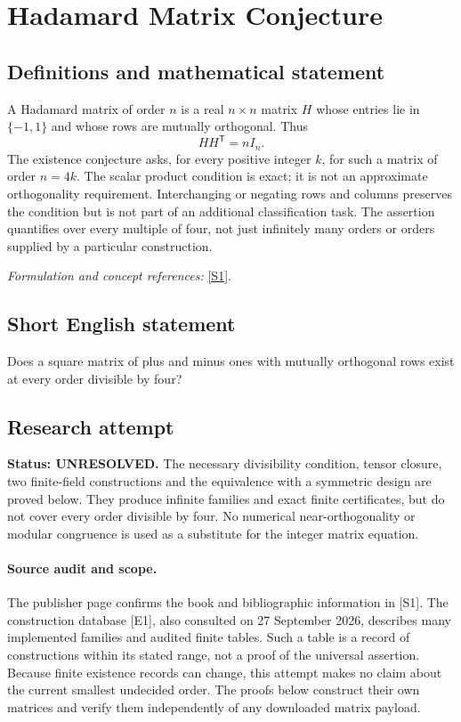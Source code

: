 \documentclass[11pt]{article}
\begin{document}
\section*{\texorpdfstring{Hadamard Matrix Conjecture}{Hadamard Matrix Conjecture}}\label{1454}
\subsection{Definitions and mathematical statement}
A Hadamard matrix of order $n$ is a real $n\times n$ matrix $H$ whose entries lie in $\{-1,1\}$ and whose rows are mutually orthogonal. Thus
\[
 HH^{\mathsf T}=nI_n.
\]
The existence conjecture asks, for every positive integer $k$, for such a matrix of order $n=4k$. The scalar product condition is exact; it is not an approximate orthogonality requirement. Interchanging or negating rows and columns preserves the condition but is not part of an additional classification task. The assertion quantifies over every multiple of four, not just infinitely many orders or orders supplied by a particular construction.
\par\smallskip\textit{Formulation and concept references:} \href{https://press.princeton.edu/books/hardcover/9780691119212/hadamard-matrices-and-their-applications}{[S1]}.

\subsection{Short English statement}
Does a square matrix of plus and minus ones with mutually orthogonal rows exist at every order divisible by four?
\subsection{Research attempt}
\textbf{Status: UNRESOLVED.} The necessary divisibility condition, tensor closure, two finite-field constructions and the equivalence with a symmetric design are proved below. They produce infinite families and exact finite certificates, but do not cover every order divisible by four. No numerical near-orthogonality or modular congruence is used as a substitute for the integer matrix equation.

\paragraph{Source audit and scope.}
The publisher page confirms the book and bibliographic information in [S1]. The construction database [E1], also consulted on 27 September 2026, describes many implemented families and audited finite tables. Such a table is a record of constructions within its stated range, not a proof of the universal assertion. Because finite existence records can change, this attempt makes no claim about the current smallest undecided order. The proofs below construct their own matrices and verify them independently of any downloaded matrix payload.
\end{document}

